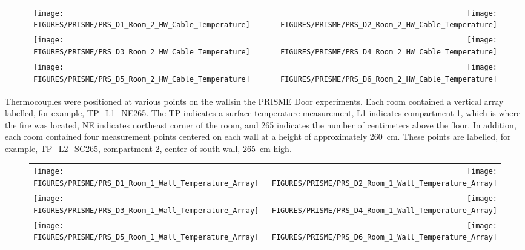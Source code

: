 \begin{figure}[p]
\begin{tabular*}{\textwidth}{l@{\extracolsep{\fill}}r}
\texttt{[image: FIGURES/PRISME/PRS\_D1\_Room\_2\_HW\_Cable\_Temperature]} &
\texttt{[image: FIGURES/PRISME/PRS\_D2\_Room\_2\_HW\_Cable\_Temperature]} \\
\texttt{[image: FIGURES/PRISME/PRS\_D3\_Room\_2\_HW\_Cable\_Temperature]} &
\texttt{[image: FIGURES/PRISME/PRS\_D4\_Room\_2\_HW\_Cable\_Temperature]} \\
\texttt{[image: FIGURES/PRISME/PRS\_D5\_Room\_2\_HW\_Cable\_Temperature]} &
\texttt{[image: FIGURES/PRISME/PRS\_D6\_Room\_2\_HW\_Cable\_Temperature]}
\end{tabular*}
\label{PRISME_HW_Cable_Room_2}
\end{figure}

\clearpage

Thermocouples were positioned at various points on the wallsin the PRISME Door experiments. Each room contained a vertical array labelled, for example, TP\_L1\_NE265. The TP indicates a surface temperature measurement, L1 indicates compartment 1, which is where the fire was located, NE indicates northeast corner of the room, and 265 indicates the number of centimeters above the floor. In addition, each room contained four measurement points centered on each wall at a height of approximately 260~cm. These points are labelled, for example, TP\_L2\_SC265, compartment 2, center of south wall, 265~cm high.

\begin{figure}[!ht]
\begin{tabular*}{\textwidth}{l@{\extracolsep{\fill}}r}
\texttt{[image: FIGURES/PRISME/PRS\_D1\_Room\_1\_Wall\_Temperature\_Array]} &
\texttt{[image: FIGURES/PRISME/PRS\_D2\_Room\_1\_Wall\_Temperature\_Array]} \\
\texttt{[image: FIGURES/PRISME/PRS\_D3\_Room\_1\_Wall\_Temperature\_Array]} &
\texttt{[image: FIGURES/PRISME/PRS\_D4\_Room\_1\_Wall\_Temperature\_Array]} \\
\texttt{[image: FIGURES/PRISME/PRS\_D5\_Room\_1\_Wall\_Temperature\_Array]} &
\texttt{[image: FIGURES/PRISME/PRS\_D6\_Room\_1\_Wall\_Temperature\_Array]}
\end{tabular*}
\label{PRISME_Wall_Array_Room_1}
\end{figure}

